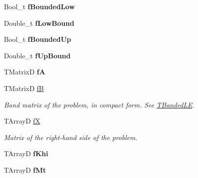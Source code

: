 \begin{DoxyCompactItemize}
\item 
\hypertarget{classTSplineFit_afbc075d838668e7ce8bfecfb153ea5f6}{Bool\-\_\-t {\bfseries f\-Bounded\-Low}}\label{classTSplineFit_afbc075d838668e7ce8bfecfb153ea5f6}

\item 
\hypertarget{classTSplineFit_a5dfb7057774bc058004ed785664f40f8}{Double\-\_\-t {\bfseries f\-Low\-Bound}}\label{classTSplineFit_a5dfb7057774bc058004ed785664f40f8}

\item 
\hypertarget{classTSplineFit_a20fb0712e2b51b0fa72bab390792bfaf}{Bool\-\_\-t {\bfseries f\-Bounded\-Up}}\label{classTSplineFit_a20fb0712e2b51b0fa72bab390792bfaf}

\item 
\hypertarget{classTSplineFit_a66cbbce7f5f2e5a8a96acc8c95b20ba6}{Double\-\_\-t {\bfseries f\-Up\-Bound}}\label{classTSplineFit_a66cbbce7f5f2e5a8a96acc8c95b20ba6}

\item 
\hypertarget{classTSplineFit_ad2f0cee2ccc20216a8e39d76374e85ab}{T\-Matrix\-D {\bfseries f\-A}}\label{classTSplineFit_ad2f0cee2ccc20216a8e39d76374e85ab}

\item 
\hypertarget{classTSplineFit_a848933d643f021983d8d033f366c508e}{T\-Matrix\-D \hyperlink{classTSplineFit_a848933d643f021983d8d033f366c508e}{f\-B}}\label{classTSplineFit_a848933d643f021983d8d033f366c508e}

\begin{DoxyCompactList}\small\item\em Band matrix of the problem, in compact form. See \hyperlink{classTBandedLE}{T\-Banded\-L\-E}. \end{DoxyCompactList}\item 
\hypertarget{classTSplineFit_aa5df41f7047cb1b994168ccbad938600}{T\-Array\-D \hyperlink{classTSplineFit_aa5df41f7047cb1b994168ccbad938600}{f\-X}}\label{classTSplineFit_aa5df41f7047cb1b994168ccbad938600}

\begin{DoxyCompactList}\small\item\em Matrix of the right-\/hand side of the problem. \end{DoxyCompactList}\item 
\hypertarget{classTSplineFit_a12245d8c958ef8523eccbc00735e09d7}{T\-Array\-D {\bfseries f\-Khi}}\label{classTSplineFit_a12245d8c958ef8523eccbc00735e09d7}

\item 
\hypertarget{classTSplineFit_af70ec4c1fea42e63fe2cfaf6b7d1b425}{T\-Array\-D {\bfseries f\-Mt}}\label{classTSplineFit_af70ec4c1fea42e63fe2cfaf6b7d1b425}


\end{DoxyCompactItemize}
